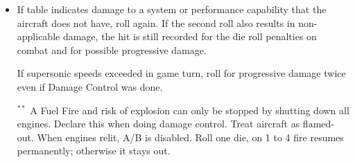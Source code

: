 {\begin{twocolumntablefloat}
\begin{twocolumntable}
{\begin{tablenote}{\linewidth}
\begin{itemize}
    \item If table indicates damage to a system or performance capability that the aircraft does not have, roll again. If the second roll also results in non-applicable damage, the hit is still recorded for the die roll penalties on combat and for possible progressive damage.
   \item[\asteriskmark] If supersonic speeds exceeded in game turn, roll for progressive damage twice even if Damage Control was done.
   \item[$^{**}$] A Fuel Fire and risk of explosion can only be stopped by shutting down all engines. Declare this when doing damage control. Treat aircraft as flamed-out. When engines relit, A/B is disabled. Roll one die, on 1 to 4 fire resumes permanently; otherwise it stays out.
\end{itemize}
\end{tablenote}

}{

}
\end{twocolumntable}
\end{twocolumntablefloat}}
